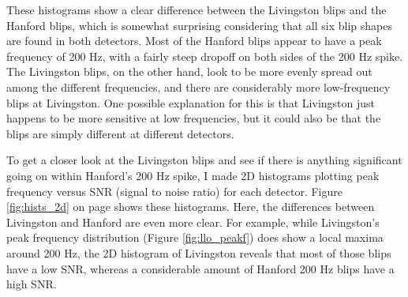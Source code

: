 \documentclass[a4paper]{article}
\begin{document}
These histograms show a clear difference between the Livingston blips and the Hanford blips, which is somewhat surprising considering that all six blip shapes are found in both detectors. Most of the Hanford blips appear to have a peak frequency of 200 Hz, with a fairly steep dropoff on both sides of the 200 Hz spike. The Livingston blips, on the other hand, look to be more evenly spread out among the different frequencies, and there are considerably more low-frequency blips at Livingston. One possible explanation for this is that Livingston just happens to be more sensitive at low frequencies, but it could also be that the blips are simply different at different detectors.

To get a closer look at the Livingston blips and see if there is anything significant going on within Hanford's 200 Hz spike, I made 2D histograms plotting peak frequency versus SNR (signal to noise ratio) for each detector. Figure \ref{fig:hists_2d}  on page \pageref{fig:hists_2d} shows these histograms. Here, the differences between Livingston and Hanford are even more clear. For example, while Livingston's peak frequency distribution (Figure \ref{fig:llo_peakf}) does show a local maxima around 200 Hz, the 2D histogram of Livingston reveals that most of those blips have a low SNR, whereas a considerable amount of Hanford 200 Hz blips have a high SNR. 
\end{document}
